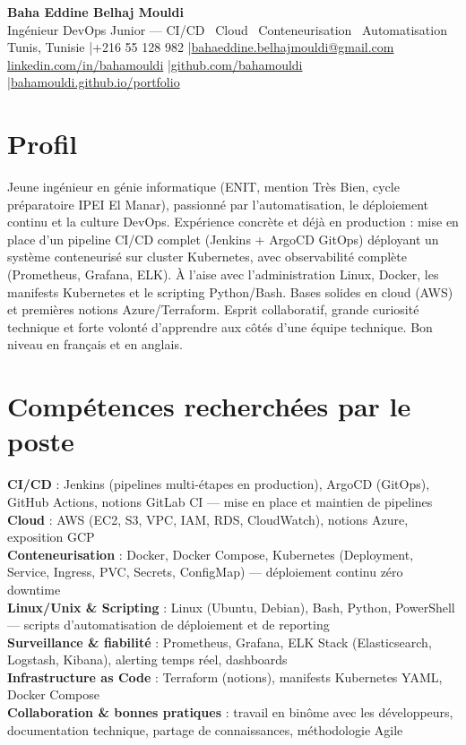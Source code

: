 \documentclass[a4paper,10pt]{article}
\begin{document}
\begin{center}
{\LARGE\bfseries\color{navy} Baha Eddine Belhaj Mouldi}\\[3pt]
{\large Ingénieur DevOps Junior --- CI/CD \textbar\ Cloud \textbar\ Conteneurisation \textbar\ Automatisation}\\[4pt]
Tunis, Tunisie \quad|\quad +216 55 128 982 \quad|\quad \href{mailto:bahaeddine.belhajmouldi@gmail.com}{bahaeddine.belhajmouldi@gmail.com}\\[1pt]
\href{https://www.linkedin.com/in/bahamouldi}{linkedin.com/in/bahamouldi} \quad|\quad \href{https://github.com/bahamouldi}{github.com/bahamouldi} \quad|\quad \href{https://bahamouldi.github.io/portfolio/}{bahamouldi.github.io/portfolio}
\end{center}
\vspace{1pt}
\section{Profil}
Jeune ingénieur en génie informatique (ENIT, mention Très Bien, cycle préparatoire IPEI El Manar), passionné par l'automatisation, le déploiement continu et la culture DevOps. Expérience concrète et déjà en production : mise en place d'un pipeline CI/CD complet (Jenkins + ArgoCD GitOps) déployant un système conteneurisé sur cluster Kubernetes, avec observabilité complète (Prometheus, Grafana, ELK). À l'aise avec l'administration Linux, Docker, les manifests Kubernetes et le scripting Python/Bash. Bases solides en cloud (AWS) et premières notions Azure/Terraform. Esprit collaboratif, grande curiosité technique et forte volonté d'apprendre aux côtés d'une équipe technique. Bon niveau en français et en anglais.
\section{Compétences recherchées par le poste}
\textbf{CI/CD} : Jenkins (pipelines multi-étapes en production), ArgoCD (GitOps), GitHub Actions, notions GitLab CI --- mise en place et maintien de pipelines\\[0.5pt]
\textbf{Cloud} : AWS (EC2, S3, VPC, IAM, RDS, CloudWatch), notions Azure, exposition GCP\\[0.5pt]
\textbf{Conteneurisation} : Docker, Docker Compose, Kubernetes (Deployment, Service, Ingress, PVC, Secrets, ConfigMap) --- déploiement continu zéro downtime\\[0.5pt]
\textbf{Linux/Unix \& Scripting} : Linux (Ubuntu, Debian), Bash, Python, PowerShell --- scripts d'automatisation de déploiement et de reporting\\[0.5pt]
\textbf{Surveillance \& fiabilité} : Prometheus, Grafana, ELK Stack (Elasticsearch, Logstash, Kibana), alerting temps réel, dashboards\\[0.5pt]
\textbf{Infrastructure as Code} : Terraform (notions), manifests Kubernetes YAML, Docker Compose\\[0.5pt]
\textbf{Collaboration \& bonnes pratiques} : travail en binôme avec les développeurs, documentation technique, partage de connaissances, méthodologie Agile
\end{document}
